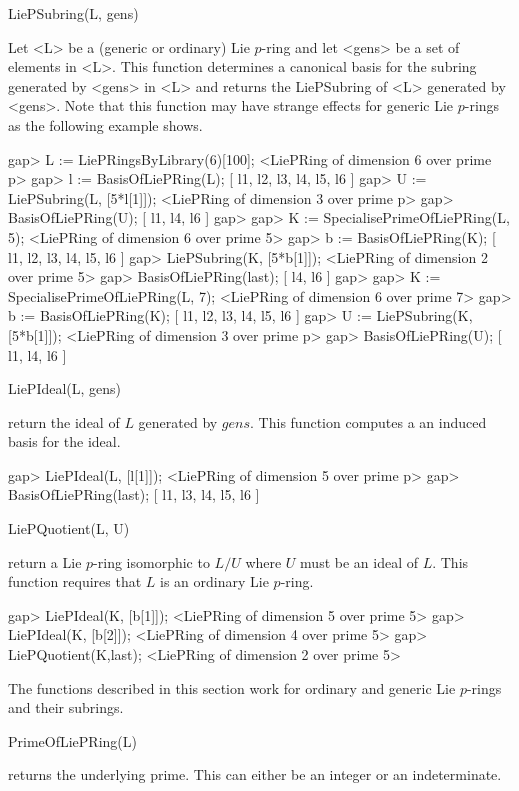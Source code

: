 \> LiePSubring(L, gens)

Let <L> be a (generic or ordinary) Lie $p$-ring and let <gens> be a set of 
elements in <L>. This function determines a canonical basis for the subring
generated by <gens> in <L> and returns the LiePSubring of <L> generated by
<gens>. Note that this function may have strange effects for generic Lie
$p$-rings as the following example shows.

\beginexample
gap> L := LiePRingsByLibrary(6)[100];
<LiePRing of dimension 6 over prime p>
gap> l := BasisOfLiePRing(L);
[ l1, l2, l3, l4, l5, l6 ]
gap> U := LiePSubring(L, [5*l[1]]);
<LiePRing of dimension 3 over prime p>
gap> BasisOfLiePRing(U);
[ l1, l4, l6 ]
gap>
gap>  K := SpecialisePrimeOfLiePRing(L, 5);
<LiePRing of dimension 6 over prime 5>
gap>  b := BasisOfLiePRing(K);
[ l1, l2, l3, l4, l5, l6 ]
gap> LiePSubring(K, [5*b[1]]);
<LiePRing of dimension 2 over prime 5>
gap>  BasisOfLiePRing(last);
[ l4, l6 ]
gap>
gap> K := SpecialisePrimeOfLiePRing(L, 7);
<LiePRing of dimension 6 over prime 7>
gap> b := BasisOfLiePRing(K);
[ l1, l2, l3, l4, l5, l6 ]
gap> U := LiePSubring(K, [5*b[1]]);
<LiePRing of dimension 3 over prime p>
gap> BasisOfLiePRing(U);
[ l1, l4, l6 ]
\endexample

\> LiePIdeal(L, gens)

return the ideal of $L$ generated by $gens$. This function computes a
an induced basis for the ideal.

\beginexample
gap> LiePIdeal(L, [l[1]]);
<LiePRing of dimension 5 over prime p>
gap> BasisOfLiePRing(last);
[ l1, l3, l4, l5, l6 ]
\endexample

\> LiePQuotient(L, U)

return a Lie $p$-ring isomorphic to $L/U$ where $U$ must be an ideal of
$L$. This function requires that $L$ is an ordinary Lie $p$-ring.

\beginexample
gap> LiePIdeal(K, [b[1]]);
<LiePRing of dimension 5 over prime 5>
gap> LiePIdeal(K, [b[2]]);
<LiePRing of dimension 4 over prime 5>
gap> LiePQuotient(K,last);
<LiePRing of dimension 2 over prime 5>
\endexample


The functions described in this section work for ordinary and generic
Lie $p$-rings and their subrings.

\> PrimeOfLiePRing(L)

returns the underlying prime. This can either be an integer or an
indeterminate.

